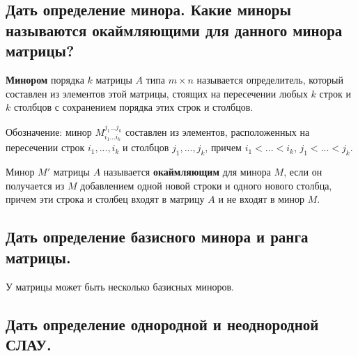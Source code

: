 
\subsection{Дать определение минора. Какие миноры называются окаймляющими для данного минора матрицы?}

{\bf{Минором}} порядка $k$ матрицы $A$ типа $m\times n$ называется определитель, который составлен из элементов этой матрицы, стоящих на пересечении любых $k$ строк и $k$ столбцов с сохранением порядка этих строк и столбцов.

Обозначение: минор $M^{j_1 ... j_k}_{i_1 ... i_k}$ составлен из элементов, расположенных на пересечении строк $i_1, ..., i_k$ и столбцов $j_1, ..., j_k$, причем $i_1<...<i_k$, $j_1<...<j_k$.

\vspace*{15pt}

Минор $M'$ матрицы $A$ называется {\bf{окаймляющим}} для минора $M$, если он получается из $M$ добавлением одной новой строки и одного нового столбца, причем эти строка и столбец входят в матрицу $A$ и не входят в минор $M$.

\subsection{Дать определение базисного минора и ранга матрицы.}


\vspace*{15pt}


У матрицы может быть несколько базисных миноров.

\subsection{Дать определение однородной и неоднородной СЛАУ.}

